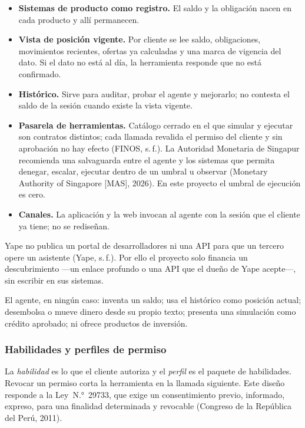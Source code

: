 \documentclass[11pt,a4paper]{article}
\begin{document}
\begin{itemize}
  \item \textbf{Sistemas de producto como registro.} El saldo y la obligación nacen en cada producto y allí permanecen.
  \item \textbf{Vista de posición vigente.} Por cliente se lee saldo, obligaciones, movimientos recientes, ofertas ya calculadas y una marca de vigencia del dato. Si el dato no está al día, la herramienta responde que no está confirmado.
  \item \textbf{Histórico.} Sirve para auditar, probar el agente y mejorarlo; no contesta el saldo de la sesión cuando existe la vista vigente.
  \item \textbf{Pasarela de herramientas.} Catálogo cerrado en el que simular y ejecutar son contratos distintos; cada llamada revalida el permiso del cliente y sin aprobación no hay efecto (FINOS, s.\,f.). La Autoridad Monetaria de Singapur recomienda una salvaguarda entre el agente y los sistemas que permita denegar, escalar, ejecutar dentro de un umbral u observar (Monetary Authority of Singapore [MAS], 2026). En este proyecto el umbral de ejecución es cero.
  \item \textbf{Canales.} La aplicación y la web invocan al agente con la sesión que el cliente ya tiene; no se rediseñan.
\end{itemize}

Yape no publica un portal de desarrolladores ni una API para que un tercero opere un asistente (Yape, s.\,f.). Por ello el proyecto solo financia un descubrimiento ---un enlace profundo o una API que el dueño de Yape acepte---, sin escribir en sus sistemas.

El agente, en ningún caso: inventa un saldo; usa el histórico como posición actual; desembolsa o mueve dinero desde su propio texto; presenta una simulación como crédito aprobado; ni ofrece productos de inversión.

\subsubsection{Habilidades y perfiles de permiso}

La \textit{habilidad} es lo que el cliente autoriza y el \textit{perfil} es el paquete de habilidades. Revocar un permiso corta la herramienta en la llamada siguiente. Este diseño responde a la Ley~N.°~29733, que exige un consentimiento previo, informado, expreso, para una finalidad determinada y revocable (Congreso de la República del Perú, 2011).
\end{document}
